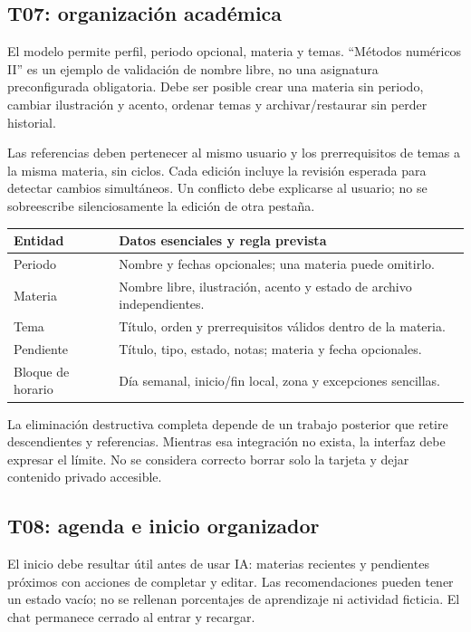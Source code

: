 \subsection{T07: organización académica}
El modelo permite perfil, periodo opcional, materia y temas. ``Métodos numéricos II'' es un ejemplo de validación de nombre libre, no una asignatura preconfigurada obligatoria. Debe ser posible crear una materia sin periodo, cambiar ilustración y acento, ordenar temas y archivar/restaurar sin perder historial.

Las referencias deben pertenecer al mismo usuario y los prerrequisitos de temas a la misma materia, sin ciclos. Cada edición incluye la revisión esperada para detectar cambios simultáneos. Un conflicto debe explicarse al usuario; no se sobreescribe silenciosamente la edición de otra pestaña.

\begin{tabularx}{\linewidth}{P{3.2cm}Y}
\toprule
\textbf{Entidad} & \textbf{Datos esenciales y regla prevista}\\
\midrule
Periodo & Nombre y fechas opcionales; una materia puede omitirlo.\\
Materia & Nombre libre, ilustración, acento y estado de archivo independientes.\\
Tema & Título, orden y prerrequisitos válidos dentro de la materia.\\
Pendiente & Título, tipo, estado, notas; materia y fecha opcionales.\\
Bloque de horario & Día semanal, inicio/fin local, zona y excepciones sencillas.\\
\bottomrule
\end{tabularx}

La eliminación destructiva completa depende de un trabajo posterior que retire descendientes y referencias. Mientras esa integración no exista, la interfaz debe expresar el límite. No se considera correcto borrar solo la tarjeta y dejar contenido privado accesible.

\subsection{T08: agenda e inicio organizador}
El inicio debe resultar útil antes de usar IA: materias recientes y pendientes próximos con acciones de completar y editar. Las recomendaciones pueden tener un estado vacío; no se rellenan porcentajes de aprendizaje ni actividad ficticia. El chat permanece cerrado al entrar y recargar.

